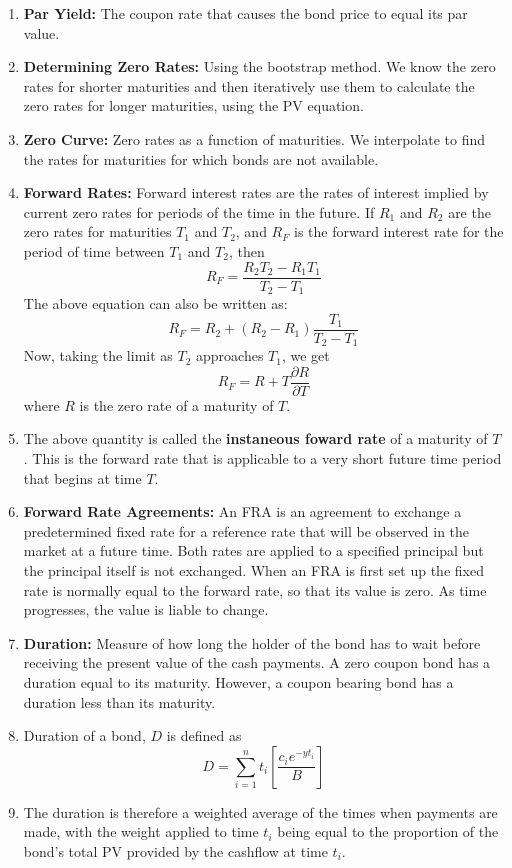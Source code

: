 \begin{enumerate}
    \item \textbf{Par Yield:} The coupon rate that causes the bond price to equal its par value.
    \item \textbf{Determining Zero Rates:} Using the bootstrap method. We know the zero rates for shorter maturities and then iteratively use them to calculate the zero rates for longer maturities, using the PV equation.
    \item \textbf{Zero Curve:} Zero rates as a function of maturities. We interpolate to find the rates for maturities for which bonds are not available.
    \item \textbf{Forward Rates:} Forward interest rates are the rates of interest implied by current zero rates for periods of the time in the future.
    If $R_1$ and $R_2$ are the zero rates for maturities $T_1$ and $T_2$, and $R_F$ is the forward interest rate for the period of time between $T_1$ and $T_2$, then 
    $$R_F = \frac{R_2 T_2 - R_1 T_1}{T_2 - T_1}$$
    The above equation can also be written as: $$R_F = R_2 + (R_2 - R_1) \frac{T_1}{T_2-T_1}$$ Now, taking the limit as $T_2$ approaches $T_1$, we get $$R_F = R + T \frac{\partial R}{\partial T}$$ where $R$ is the zero rate of a maturity of $T$.
    \item The above quantity is called the \textbf{instaneous foward rate} of a maturity of $T$. This is the forward rate that is applicable to a very short future time period that begins at time $T$.
    \item \textbf{Forward Rate Agreements:} An FRA is an agreement to exchange a predetermined fixed rate for a reference rate that will be observed in the market at a future time. Both rates are applied to a specified principal but the principal itself is not exchanged.
    When an FRA is first set up the fixed rate is normally equal to the forward rate, so that its value is zero. As time progresses, the value is liable to change.
    \item \textbf{Duration:} Measure of how long the holder of the bond has to wait before receiving the present value of the cash payments. A zero coupon bond has a duration equal to its maturity. However, a coupon bearing bond has a duration less than its maturity.
    \item Duration of a bond, $D$ is defined as $$D = \sum_{i= 1}^{n} { t_i \left[ \frac{c_i e^{-yt_i}}{B} \right]} $$
    \item The duration is therefore a weighted average of the times when payments are made, with the weight applied to time $t_i$ being equal to the proportion of the bond's total PV provided by the cashflow at time $t_i$.

\end{enumerate}
